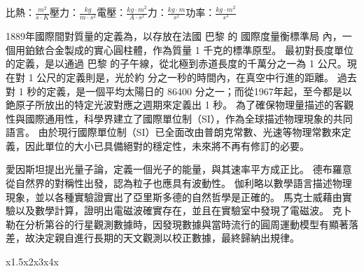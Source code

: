 \documentclass[10pt,a4paper]{article}
\begin{document}
{比熱：$\frac{m^2}{s\cdot K}$}{壓力：$\frac{kg}{m\cdot s^2}$}{電壓：$\frac{kg\cdot m^2}{A\cdot s^2}$}{力：$\frac{kg\cdot m}{s^2}$}{功率：$\frac{kg\cdot m^2}{s^3}$}

{1889年國際間對質量的定義為，以存放在法國 巴黎 的 國際度量衡標準局 內，一個用鉑銥合金製成的實心圓柱體，作為質量 1 千克的標準原型。}
{最初對長度單位的定義，是以通過 巴黎 的子午線，從北極到赤道長度的千萬分之一為 1 公尺。現在對 1 公尺的定義則是，光於約  分之一秒的時間內，在真空中行進的距離。}
{過去對 1 秒的定義，是一個平均太陽日的 86400 分之一；而從1967年起，至今都是以銫原子所放出的特定光波對應之週期來定義出 1 秒。}
{為了確保物理量描述的客觀性與國際通用性，科學界建立了國際單位制（SI），作為全球描述物理現象的共同語言。}
{由於現行國際單位制（SI）已全面改由普朗克常數、光速等物理常數來定義，因此單位的大小已具備絕對的穩定性，未來將不再有修訂的必要。}

{愛因斯坦提出光量子論，定義一個光子的能量，與其速率平方成正比。}
{德布羅意從自然界的對稱性出發，認為粒子也應具有波動性。}
{伽利略以數學語言描述物理現象，並以各種實驗證實出了亞里斯多德的自然哲學是正確的。}
{馬克士威藉由實驗以及數學計算，證明出電磁波確實存在，並且在實驗室中發現了電磁波。}
{克卜勒在分析第谷的行星觀測數據時，因發現數據與當時流行的圓周運動模型有顯著落差，故決定親自進行長期的天文觀測以校正數據，最終歸納出規律。}

{x}{1.5x}{2x}{3x}{4x}



\end{document}

